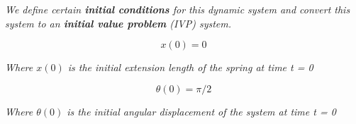 \textit{We define certain \textbf{initial conditions} for this dynamic system and convert this system to an \textbf{initial value problem} (IVP) system.}
        
    $$x(0) = 0$$
        
    \textit{Where $x(0)$ is the initial extension length of the spring at time t = 0}
        
    $$\theta(0) = \pi/2$$
        
    \textit{Where $\theta(0)$ is the initial angular displacement of the system at time t = 0}
        
        

